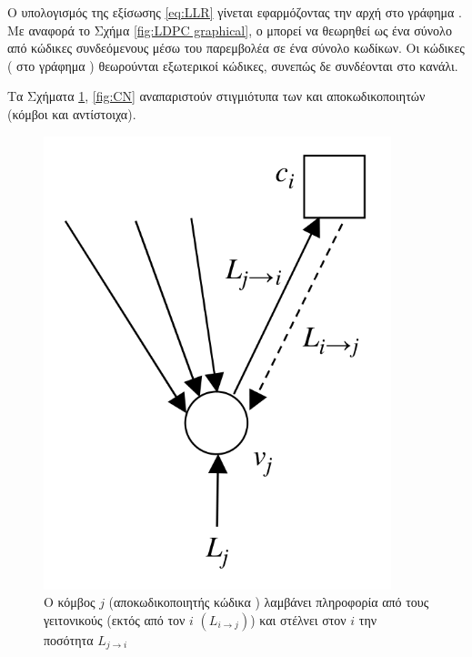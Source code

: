 Ο υπολογισμός της εξίσωσης \ref{eq:LLR} γίνεται εφαρμόζοντας την αρχή  στο γράφημα . Με αναφορά το Σχήμα \ref{fig:LDPC graphical}, ο  μπορεί να θεωρηθεί ως ένα σύνολο από  κώδικες συνδεόμενους μέσω του παρεμβολέα σε ένα σύνολο  κωδίκων. Οι  κώδικες ( στο γράφημα ) θεωρούνται εξωτερικοί κώδικες, συνεπώς δε συνδέονται στο κανάλι.

Τα Σχήματα \ref{fig:VN}, \ref{fig:CN} αναπαριστούν στιγμιότυπα των  και  αποκωδικοποιητών (κόμβοι  και  αντίστοιχα).

\begin{figure}[h]
    \centering
    \begin{minipage}{0.45\textwidth}
        \centering
        \includegraphics[width=0.9\textwidth]{figures/VN.png}
        \caption{Ο κόμβος  $j$ (αποκωδικοποιητής κώδικα ) λαμβάνει πληροφορία από τους γειτονικούς  (εκτός από τον $i$ $(L_{i\to j})$) και στέλνει στον  $i$ την ποσότητα $L_{j\to i}$}
        \label{fig:VN}
    \end{minipage}\hfill
    \begin{minipage}{0.45\textwidth}

\end{minipage}
\end{figure}
